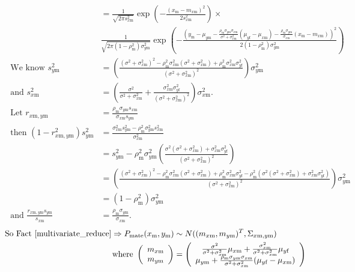 \documentclass{article}
\newcommand{\x}[1]{\text{#1}}
\begin{document}
\begin{pf}
\begin{enumerate}
\begin{align*}
\\&=\frac{1}{\sqrt{2\pi s_{x\x{m}}^2}}\exp\left(-\frac{(x_\x{m}-m_{x\x{m}})^2}{2s_{x\x{m}}^2}\right)\times
\\&\frac{1}{\sqrt{2\pi(1-\rho_\x{m}^2)\sigma_{y\x{m}}^2}}\exp\left(-\frac{\left(y_\x{m}-\mu_{y\x{m}}-\frac{\rho_\x{m}\sigma_{y\x{m}}\sigma_{x\x{m}}}{\sigma^2+\sigma_{x\x{m}}^2}(\mu_{y\x{f}}-\mu_{x\x{m}})-\frac{\rho_\x{m}\sigma_{y\x{m}}}{\sigma_{x\x{m}}}(x_\x{m}-m_{x\x{m}})\right)^2}{2(1-\rho_\x{m}^2)\sigma_{y\x{m}}^2}\right)
\\ \text{ We know } s_{y\x{m}}^2&=\left(\frac{(\sigma^2+\sigma_{x\x{m}}^2)^2-\rho_\x{m}^2\sigma_{x\x{m}}^2(\sigma^2+\sigma_{x\x{m}}^2)+\rho_\x{m}^2\sigma_{x\x{m}}^2\sigma_{y\x{f}}^2}{(\sigma^2+\sigma_{x\x{m}}^2)^2}\right)\sigma_{y\x{m}}^2
\\ \text{ and } s_{x\x{m}}^2&=\left(\frac{\sigma^2}{\sigma^2+\sigma_{x\x{m}}^2}+\frac{\sigma_{x\x{m}}^2\sigma_{y\x{f}}^2}{(\sigma^2+\sigma_{x\x{m}}^2)^2}\right)\sigma_{x\x{m}}^2.
\\\text{ Let } r_{x\x{m},y\x{m}}&=\frac{\rho_\x{m}\sigma_{y\x{m}}s_{x\x{m}}}{\sigma_{x\x{m}}s_{y\x{m}}}
\\ \text{ then } (1-r_{x\x{m},y\x{m}}^2)s_{y\x{m}}^2&=\frac{\sigma_{x\x{m}}^2s_{y\x{m}}^2-\rho_\x{m}^2\sigma_{y\x{m}}^2s_{x\x{m}}^2}{\sigma_{x\x{m}}^2}
\\&=s_{y\x{m}}^2-\rho_\x{m}^2\sigma_{y\x{m}}^2\left(\frac{\sigma^2(\sigma^2+\sigma_{x\x{m}}^2)+\sigma_{x\x{m}}^2\sigma_{y\x{f}}^2}{(\sigma^2+\sigma_{x\x{m}}^2)^2}\right)
\\&=\left(\frac{(\sigma^2+\sigma_{x\x{m}}^2)^2-\rho_\x{m}^2\sigma_{x\x{m}}^2(\sigma^2+\sigma_{x\x{m}}^2)+\rho_\x{m}^2\sigma_{x\x{m}}^2\sigma_{y\x{f}}^2-\rho_\x{m}^2(\sigma^2(\sigma^2+\sigma_{x\x{m}}^2)+\sigma_{x\x{m}}^2\sigma_{y\x{f}}^2)}{(\sigma^2+\sigma_{x\x{m}}^2)^2}\right)\sigma_{y\x{m}}^2
\\&=(1-\rho_\x{m}^2)\sigma_{y\x{m}}^2
\\ \text{ and } \frac{r_{x\x{m},y\x{m}}s_{y\x{m}}}{s_{x\x{m}}}&=\frac{\rho_\x{m}\sigma_{y\x{m}}}{\sigma_{x\x{m}}}.
\end{align*}
\begin{align*}
\text{So Fact \ref{multivariate_reduce}}\Rightarrow P_\text{mate}(x_\x{m},y_\x{m})&\sim N((m_{x\x{m}},m_{y\x{m}})^T,\Sigma_{x\x{m},y\x{m}}) 
\\ \text{ where } \left(\begin{array}{c}m_{x\x{m}} \\ m_{y\x{m}} \end{array}\right)&=\left(\begin{array}{c}\frac{\sigma^2}{\sigma^2+\sigma_{x\x{m}}^2}\mu_{x\x{m}}+\frac{\sigma_{x\x{m}}^2}{\sigma^2+\sigma_{x\x{m}}^2}\mu_{y\x{f}} \\ \mu_{y\x{m}}+\frac{\rho_\x{m}\sigma_{y\x{m}}\sigma_{x\x{m}}}{\sigma^2+\sigma_{x\x{m}}^2}(\mu_{y\x{f}}-\mu_{x\x{m}}) \end{array}\right)

\end{align*}
\end{enumerate}
\end{pf}
\end{document}
